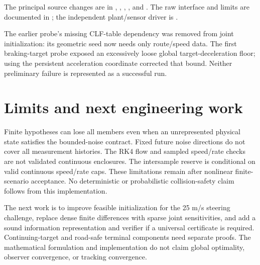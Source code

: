 \documentclass[11pt]{article}
\begin{document}
The principal source changes are in ,
,
,
, and
.
The raw interface and limits are documented in ; the independent
plant/sensor driver is .

The earlier probe's missing CLF-table dependency was removed from joint
initialization: its geometric seed now needs only route/speed data. The first
braking-target probe exposed an excessively loose global target-deceleration
floor; using the persistent acceleration coordinate corrected that bound.
Neither preliminary failure is represented as a successful run.

\section*{Limits and next engineering work}
Finite hypotheses can lose all members even when an unrepresented physical
state satisfies the bounded-noise contract. Fixed future noise directions do
not cover all measurement histories. The RK4 flow and sampled speed/rate checks
are not validated continuous enclosures. The intersample reserve is conditional
on valid continuous speed/rate caps. These limitations remain after nonlinear
finite-scenario acceptance. No deterministic or probabilistic collision-safety
claim follows from this implementation.

The next work is to improve feasible initialization for the 25 m/s steering
challenge, replace dense finite differences with sparse joint sensitivities,
and add a sound information representation and verifier if a universal
certificate is required. Continuing-target and road-safe terminal components
need separate proofs. The mathematical formulation and implementation do not
claim global optimality, observer convergence, or tracking convergence.
\end{document}
